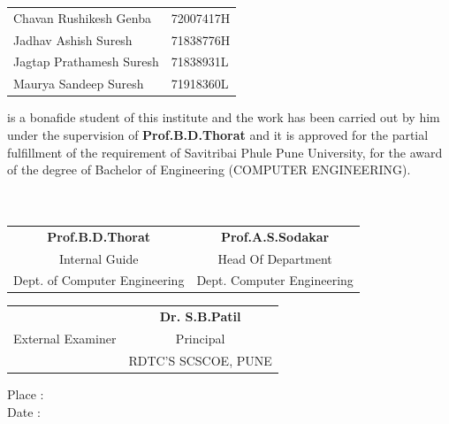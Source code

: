\documentclass[oneside,a4paper,12pt]{report}
\begin{document}
\begin{center}
\begin{tabular}{l l}
Chavan Rushikesh Genba & 72007417H\\
Jadhav Ashish Suresh & 71838776H\\
Jagtap Prathamesh Suresh  & 71838931L\\
Maurya Sandeep Suresh  & 71918360L\\
\end{tabular}
\end{center}

\vspace*{0.5\baselineskip}

is a bonafide student of this institute and the work has been carried out by him under the supervision of \textbf{Prof.B.D.Thorat} and it is approved for the partial fulfillment of the requirement of Savitribai Phule Pune University, for the award of the degree of Bachelor of Engineering (COMPUTER ENGINEERING). \\\\\\


\bgroup
\def\arraystretch{0.5}
\begin{tabular}{c c }
\textbf{Prof.B.D.Thorat} &  \hspace{20 mm} \textbf{Prof.A.S.Sodakar } \\								
Internal Guide   &  \hspace{20 mm}Head Of Department \\
Dept. of Computer Engineering &	\hspace{20 mm}Dept. Computer Engineering
\end{tabular}

\vspace*{4\baselineskip}
\bgroup
\def\arraystretch{0.5}
\begin{tabular}{c c }
 &  \hspace{45 mm} \textbf{Dr. S.B.Patil} \\								
 \hspace{5 mm}External Examiner  &  \hspace{45 mm}Principal \\
  &	\hspace{45 mm}RDTC'S SCSCOE, PUNE\\
\end{tabular}
\vspace*{0.5\baselineskip}

Place : \\
Date  : 
\end{document}
